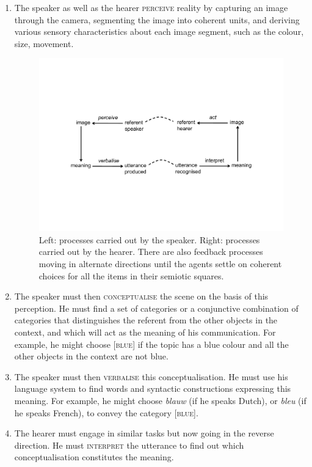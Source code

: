 \begin{enumerate}
\item The speaker as well as the hearer {\scshape perceive} reality
by capturing an image through the camera, segmenting 
the image into coherent units, and deriving various 
sensory characteristics about each image segment, 
such as the colour, size, movement. 

\begin{figure}[htbp]
  \centerline{\includegraphics[width=.75\textwidth]{chap2/figs/triangle2.pdf}}
\caption{\label{triangle2a}Left: processes carried
out by the speaker. Right: processes carried out by the hearer.
There are also feedback processes moving in alternate directions
until the agents settle on coherent choices for all the items
in their semiotic squares.}
\end{figure}

\item The speaker must then {\scshape conceptualise} the 
scene on the basis of this perception. He must find a set of
categories or a conjunctive combination of 
categories that distinguishes the referent from the other objects in 
the context, and which will act as the meaning of 
his communication. For example, he might choose [\textsc{blue}] if the
topic has a blue colour and all the other objects in the 
context are not blue. 

\item The speaker must then {\scshape verbalise} this conceptualisation. 
He must use his language system to find words and 
syntactic constructions expressing this meaning.
For example, he might choose \textit{blauw} (if he speaks
Dutch), or \textit{bleu} (if he speaks French),
to convey the category [\textsc{blue}]. 

\item The hearer must engage in similar tasks but now
going in the reverse direction. He must
{\scshape interpret} the utterance to find out which
conceptualisation constitutes the meaning. 


\end{enumerate}
